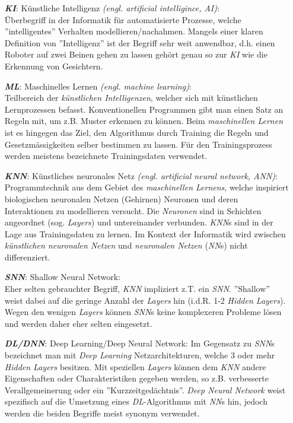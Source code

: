 \begin{itemize}[leftmargin=1.5cm]
	\item[\textbf{\textit{KI}}:] Künstliche Intelligenz \textit{(engl. artificial intelligince, AI)}:\\
	 Überbegriff in der Informatik für automatisierte Prozesse, welche ''intelligentes'' Verhalten modellieren/nachahmen. Mangels einer klaren Definition von ''Intelligenz'' ist der Begriff sehr weit anwendbar, d.h. einen Roboter auf zwei Beinen gehen zu lassen gehört genau so zur \textit{KI} wie die Erkennung von Gesichtern.
	 
	\item[\textbf{\textit{ML}}:] Maschinelles Lernen \textit{(engl. machine learning)}:\\
	Teilbereich der \textit{künstlichen Intelligenzen}, welcher sich mit künstlichen Lernprozessen befasst. Konventionellen Programmen gibt man einen Satz an Regeln mit, um z.B. Muster erkennen zu können. Beim \textit{maschinellen Lernen} ist es hingegen das Ziel, den Algorithmus durch Training die Regeln und Gesetzmässigkeiten selber bestimmen zu lassen. Für den Trainingsprozess werden meistens bezeichnete Trainingsdaten verwendet. 
	
	\item[\textbf{\textit{KNN}}:] Künstliches neuronales Netz \textit{(engl. artificial neural network, ANN)}:\\
	Programmtechnik aus dem Gebiet des \textit{maschinellen Lernens}, welche inspiriert biologischen neuronalen Netzen (Gehirnen) Neuronen und deren Interaktionen zu modellieren versucht. Die \textit{Neuronen} sind in Schichten angeordnet (sog. \textit{Layers}) und untereinander verbunden. \textit{KNN}s sind in der Lage aus Trainingsdaten zu lernen. Im Kontext der Informatik wird zwischen \textit{künstlichen neuronalen Netzen} und \textit{neuronalen Netzen} (\textit{NN}s) nicht differenziert.
	
	\item[\textbf{\textit{SNN}}:] Shallow Neural Network:\\
	Eher selten gebrauchter Begriff, \textit{KNN} impliziert z.T. ein \textit{SNN}. ''Shallow'' weist dabei auf die geringe Anzahl der \textit{Layers} hin (i.d.R. 1-2 \textit{Hidden Layers}). Wegen den wenigen \textit{Layers} können \textit{SNN}s keine komplexeren Probleme lösen und werden daher eher selten eingesetzt.
		
	\item[\textbf{\textit{DL/DNN}}:] Deep Learning/Deep Neural Network:
	Im Gegensatz zu \textit{SNN}s bezeichnet man mit \textit{Deep Learning} Netzarchitekturen, welche 3 oder mehr \textit{Hidden Layers} besitzen. Mit speziellen \textit{Layers} können dem \textit{KNN} andere Eigenschaften oder Charakteristiken gegeben werden, so z.B. verbesserte Verallgemeinerung oder ein ''Kurzzeitgedächtnis''. \textit{Deep Neural Network} weist spezifisch auf die Umsetzung eines \textit{DL}-Algorithmus mit \textit{NN}s hin, jedoch werden die beiden Begriffe meist synonym verwendet.
	

\end{itemize}

